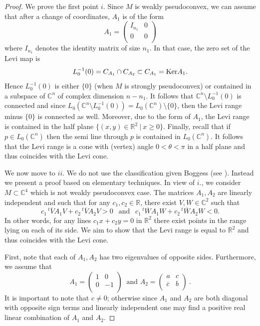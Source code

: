 \documentclass[12pt]{amsart}
\newcommand{\C}{\mathbb C}
\newcommand{\R}{\mathbb R}
\newcommand{\transp}{\,^t}
\theoremstyle{remark}
\theoremstyle{example}
\theoremstyle{definition}
\numberwithin{equation}{section}
\begin{document}
\begin{proof}
We prove the first point $i.$ Since $M$ is weakly pseudoconvex, we can assume that after a change of coordinates, $A_1$ is of the form  
$$A_1=\begin{pmatrix}
I_{n_1} & 0 \\
0 & 0\\
\end{pmatrix} $$
where $I_{n_1}$ denotes the identity matrix of size $n_1$. In that case, the zero set of the Levi map is
$$L_0^{-1}(0)=C_{A_1} \cap C_{A_2} \subset C_{A_1}={\rm Ker } A_1.$$
Hence $L_0^{-1}(0)$ is either $\{0\}$ (when $M$ is strongly pseudoconvex) or contained in a subspace of $\C^n$ of complex dimension $n-n_1$. It follows that  $\C^n \setminus L_0^{-1}(0)$ is connected and since 
 $L_0(\C^n\setminus L_0^{-1}(0))=L_0(\C^n) \setminus \{0\}$, then the Levi range minus $\{0\}$ is connected as well. Moreover, due to the form of $A_1$, the Levi range is contained in the half plane $\{ (x,y) \in \R^2 \ | \ x \geq 0\}$.     
 Finally, recall that if $p \in L_0(\C^n)$ then the semi line through $p$ is contained in $L_0(\C^n)$. It follows that the Levi range is a  cone with (vertex) angle $0<\theta<\pi$ in a half plane and thus coincides with the Levi cone.

\vspace{0.5cm}
We now move to  $ii$. We do not use the classification given Boggess (see \cite{bo}). Instead we present a proof based on elementary techniques. In view of $i.$, we consider  $M \subset \C^4$ which is not weakly pseudoconvex case. The matrices $A_1, 
A_2$ are linearly independent and such that for any $c_1,c_2\in \R$, there exist $V,W \in \C^2$ such that 
$$c_1\transp\overline{V}A_1V+ c_2\transp\overline{V}A_2V > 0 \ \ \mbox{ and } \ \ c_1\transp\overline{W}A_1W+ 
c_2\transp\overline{W}A_2W < 0.$$
In other words, for any lines $c_1x+c_2y=0$ in $\R^2$ there exist points in the range lying on each of its side. We aim to show that 
the Levi range is equal to $\R^2$ and thus coincides with the Levi 
cone. 

First, note that each of $A_1,A_2$ has two eigenvalues of opposite sides. Furthermore, we assume that 
$$A_1=\begin{pmatrix}
1 & 0 \\
0 & -1\\
\end{pmatrix} \ \mbox{ and } A_2=\begin{pmatrix}
a & c \\
\overline{c} & b\\
\end{pmatrix}\ 
.$$
 It is important to note that $c\neq0$; otherwise since $A_1$ and $A_2$ are both diagonal with opposite sign terms and linearly independent one may find a positive real linear combination of $A_1$ and $A_2$. 
 

\end{proof}
\end{document}
